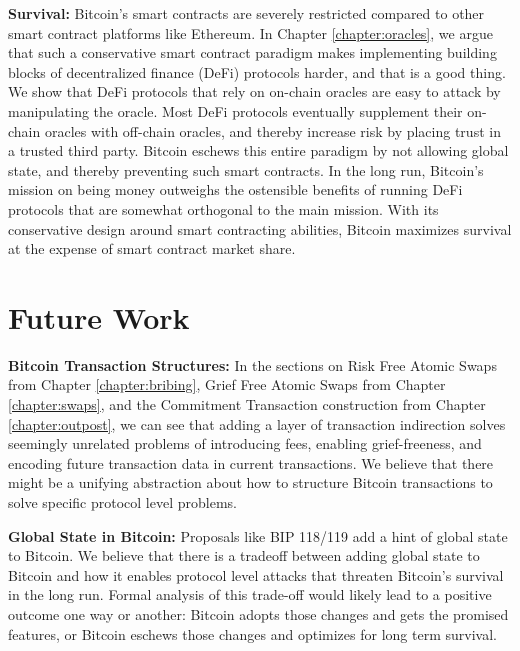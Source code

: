 \textbf{Survival:} Bitcoin's smart contracts are severely restricted compared to other smart contract platforms like Ethereum. In Chapter \ref{chapter:oracles}, we argue that such a conservative smart contract paradigm makes implementing building blocks of decentralized finance (DeFi) protocols harder, and that is a good thing. We show that DeFi protocols that rely on on-chain oracles are easy to attack by manipulating the oracle. Most DeFi protocols eventually supplement their on-chain oracles with off-chain oracles, and thereby increase risk by placing trust in a trusted third party. Bitcoin eschews this entire paradigm by not allowing global state, and thereby preventing such smart contracts. In the long run, Bitcoin's mission on being money outweighs the ostensible benefits of running DeFi protocols that are somewhat orthogonal to the main mission. With its conservative design around smart contracting abilities, Bitcoin maximizes survival at the expense of smart contract market share.

\section{Future Work}
\textbf{Bitcoin Transaction Structures:} In the sections on Risk Free Atomic Swaps from Chapter \ref{chapter:bribing}, Grief Free Atomic Swaps from Chapter \ref{chapter:swaps}, and the Commitment Transaction construction from Chapter \ref{chapter:outpost}, we can see that adding a layer of transaction indirection solves seemingly unrelated problems of introducing fees, enabling grief-freeness, and encoding future transaction data in current transactions. We believe that there might be a unifying abstraction about how to structure Bitcoin transactions to solve specific protocol level problems.

\textbf{Global State in Bitcoin:} Proposals like BIP 118/119 add a hint of global state to Bitcoin. We believe that there is a tradeoff between adding global state to Bitcoin and how it enables protocol level attacks that threaten Bitcoin's survival in the long run. Formal analysis of this trade-off would likely lead to a positive outcome one way or another: Bitcoin adopts those changes and gets the promised features, or Bitcoin eschews those changes and optimizes for long term survival.

